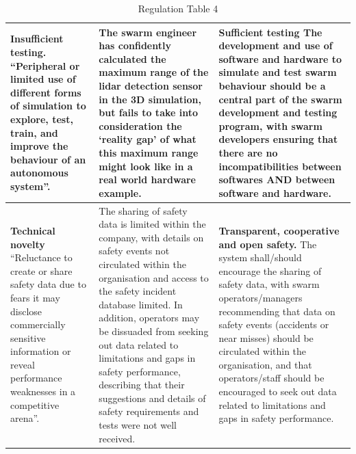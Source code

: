 \documentclass[lettersize,journal]{IEEEtran}
\begin{document}
\begin{landscape}
\begin{table}[]
\begin{tabular}{|p{0.3\textheight}|p{0.35\textheight}|p{0.35\textheight}|}
         \hline
         \textbf{Insufficient testing.} ``Peripheral or limited use of different forms of simulation to explore, test, train, and improve the behaviour of an autonomous system”. \cite{macrae2021learning} & The swarm engineer has confidently calculated the maximum range of the lidar detection sensor in the 3D simulation, but fails to take into consideration the ‘reality gap’ of what this maximum range might look like in a real world hardware example. & \textbf{Sufficient testing} The development and use of software and hardware to simulate and test swarm behaviour should be a central part of the swarm development and testing program, with swarm developers ensuring that there are no incompatibilities between softwares AND between software and hardware. \\
         \hline
         \textbf{Technical novelty} ``Reluctance to create or share safety data due to fears it may disclose commercially sensitive information or reveal performance weaknesses in a competitive arena”. \cite{macrae2021learning} & The sharing of safety data is limited within the company, with details on safety events not circulated within the organisation and access to the safety incident database limited. In addition, operators may be dissuaded from seeking out data related to limitations and gaps in safety performance, describing that their suggestions and details of safety requirements and tests were not well received. & \textbf{Transparent, cooperative and open safety.} The system shall/should encourage the sharing of safety data, with swarm operators/managers recommending that data on safety events (accidents or near misses) should be circulated within the organisation, and that operators/staff should be encouraged to seek out data related to limitations and gaps in safety performance.\\
         \hline
    \end{tabular}
    \caption{Regulation Table 4}
    \label{tab:reg_4}
\end{table}
\end{landscape}
\end{document}
